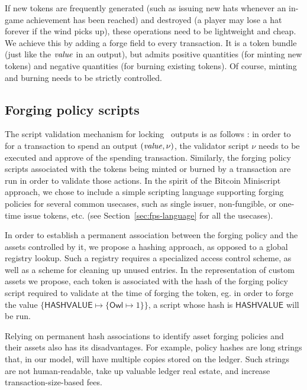 If new tokens are frequently generated (such as issuing new hats whenever an in-game achievement has been reached) and destroyed (a player may lose a hat forever if the wind picks up), these operations need to be lightweight and cheap. We achieve this by adding a forge field to every transaction. It is a token bundle (just like the $\mathit{value}$ in an output), but admits positive quantities (for minting new tokens) and negative quantities (for burning existing tokens). Of course, minting and burning needs to be strictly controlled.

\subsection{Forging policy scripts}

The script validation mechanism for locking \UTXO\ outputs is as follows :
in order to for a transaction to spend an output \((\mathit{value}, \nu)\), the validator
script $\nu$ needs to be executed and approve of the spending transaction.
Similarly, the forging
policy scripts associated with the tokens being minted or burned by a transaction
are run in order to validate those actions.
In the spirit of the Bitcoin Miniscript approach, we chose to include a simple
scripting language supporting forging policies for several common usecases, such as
single issuer, non-fungible, or one-time issue tokens, etc.
(see Section~\ref{sec:fps-language} for all the usecases).

In order to establish a permanent association between the forging policy and the
assets controlled by it, we propose a hashing approach, as opposed to a global registry
lookup. Such a registry requires a specialized access control scheme, as well
as a scheme for cleaning up unused entries.
In the representation of custom assets we propose, each token is associated with the
hash of the forging policy script required to validate at the time of forging
the token, eg.
in order to forge the value
\(\{\mathsf{HASHVALUE} \mapsto \{\mathsf{Owl} \mapsto 1\}\}\), a script whose
hash is $\mathsf{HASHVALUE}$ will be run.

Relying on permanent hash associations to identify asset forging policies and their assets also has its disadvantages.
For example, policy hashes are long strings that, in our model, will have multiple copies stored on the ledger.
Such strings are not human-readable, take up valuable ledger real estate, and increase transaction-size-based fees.

